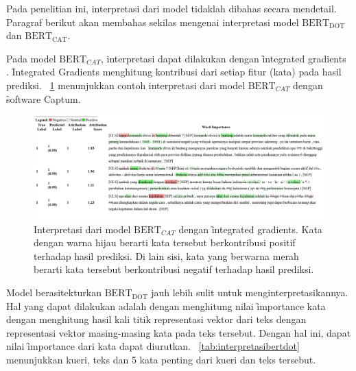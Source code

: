 Pada penelitian ini, interpretasi dari model tidaklah dibahas secara mendetail. Paragraf berikut akan membahas sekilas mengenai interpretasi model $\text{BERT}_{\text{DOT}}$ dan $\text{BERT}_{\text{CAT}}$.

Pada model $\text{BERT}_{CAT}$, interpretasi dapat dilakukan dengan \f{integrated gradients} \citep{integratedgradient}. \f{Integrated Gradients} menghitung kontribusi dari setiap fitur (kata) pada hasil prediksi. \pic~\ref{fig:InterpretasiBERTCAT} menunjukkan contoh interpretasi dari model $\text{BERT}_{CAT}$ dengan \f{software} Captum.

\begin{figure}
    \centering
    \includegraphics[width=1\textwidth]{assets/pics/IGBERTCAT.png}
    \caption{Interpretasi dari model $\text{BERT}_{CAT}$ dengan \f{integrated gradients}. Kata dengan warna hijau berarti kata tersebut berkontribusi positif terhadap hasil prediksi. Di lain sisi, kata yang berwarna merah berarti kata tersebut berkontribusi negatif terhadap hasil prediksi.}
    \label{fig:InterpretasiBERTCAT}
\end{figure}

Model berasitekturkan $\text{BERT}_{\text{DOT}}$ jauh lebih sulit untuk menginterpretasikannya. Hal yang dapat dilakukan adalah dengan menghitung nilai \f{importance} kata dengan menghitung hasil kali titik representasi vektor dari teks dengan representasi vektor masing-masing kata pada teks tersebut. Dengan hal ini, dapat nilai \f{importance} dari kata dapat diurutkan. \tab~\ref{tab:interpretasibertdot} menunjukkan kueri, teks dan 5 kata penting dari kueri dan teks tersebut.

